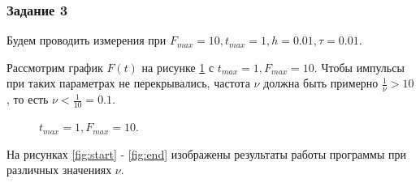 \documentclass[a4paper,14pt]{article}
\begin{document}
\subsubsection*{Задание 3}

Будем проводить измерения при $F_{max} = 10, t_{max} = 1, h = 0.01, \tau = 0.01$.

Рассмотрим график $F(t)$ на рисунке \ref{fig:al} с $t_{max} = 1, F_{max} = 10$.
Чтобы импульсы при таких параметрах не перекрывались, частота $\nu$
должна быть примерно $\frac{1}{\nu} > 10$, то есть $\nu < \frac{1}{10} = 0.1$.

\begin{figure}[!h]
	\caption{$t_{max} = 1, F_{max} = 10$.}
	\label{fig:al}
\end{figure}

На рисунках \ref{fig:start} - \ref{fig:end} изображены результаты работы программы
при различных значениях $\nu$.
\end{document}
